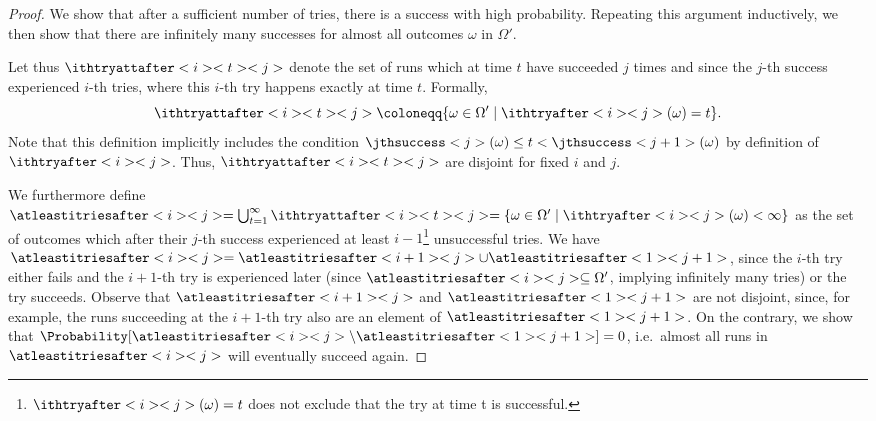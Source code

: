 \documentclass{theoretics}
\newcommand{\unionSym}{\cup}
\newcommand{\unionBin}{\mathbin{\unionSym}}
\newcommand{\UnionSym}{\bigcup}
\newcommand{\union}{\unionBin}
\newcommand{\Union}{\UnionSym}
\begin{document}
\begin{proof}
	We show that after a sufficient number of tries, there is a success with high probability.
	Repeating this argument inductively, we then show that there are infinitely many successes for almost all outcomes $\omega$ in $\Omega'$.

	Let thus $\ithtryattafter<i><t><j>$ denote the set of runs which at time $t$ have succeeded $j$ times and since the $j$-th success experienced $i$-th tries, where this $i$-th try happens exactly at time $t$.
	Formally,
	\begin{equation*}
		\ithtryattafter<i><t><j> \coloneqq \{\omega \in \Omega' \mid \ithtryafter<i><j>(\omega) = t\}.
	\end{equation*}
	Note that this definition implicitly includes the condition $\jthsuccess<j>(\omega) \leq t < \jthsuccess<j+1>(\omega)$ by definition of $\ithtryafter<i><j>$.
	Thus, $\ithtryattafter<i><t><j>$ are disjoint for fixed $i$ and $j$.

	We furthermore define $\atleastitriesafter<i><j> = \Union_{t=1}^\infty \ithtryattafter<i><t><j> = \{\omega \in \Omega' \mid \ithtryafter<i><j>(\omega) < \infty\}$ as the set of outcomes which after their $j$-th success experienced at least $i - 1$\footnote{$\ithtryafter<i><j>(\omega) = t$ does not exclude that the try at time t is successful.} unsuccessful tries.
	We have $\atleastitriesafter<i><j> = \atleastitriesafter<i+1><j> \union \atleastitriesafter<1><j+1>$, since the $i$-th try either fails and the $i+1$-th try is experienced later (since $\atleastitriesafter<i><j> \subseteq \Omega'$, implying infinitely many tries) or the try succeeds.
	Observe that $\atleastitriesafter<i+1><j>$ and $\atleastitriesafter<1><j+1>$ are not disjoint, since, for example, the runs succeeding at the $i+1$-th try also are an element of $\atleastitriesafter<1><j+1>$.
	On the contrary, we show that $\Probability[\atleastitriesafter<i><j> \setminus \atleastitriesafter<1><j+1>] = 0$, i.e.\ almost all runs in $\atleastitriesafter<i><j>$ will eventually succeed again.

	\newcommand{\tryset}{\mathsf{Tries}}
	\newcommand{\successset}{\mathsf{Succs}}
	\newcommand{\trytime}{\mathsf{TryTime}}
	\newcommand{\successtime}{\mathsf{SuccTime}}
	\newcommand{\successruns}{\mathsf{SuccSet}}


\end{proof}
\end{document}
